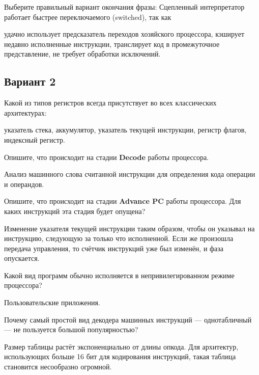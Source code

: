 \begin{questions}
\question[3] Выберите правильный вариант окончания фразы: Сцепленный интерпретатор работает быстрее переключаемого (switched), так как
\begin{choices}
    \correctchoice удачно использует предсказатель переходов хозяйского процессора,
    \choice кэширует недавно исполненные инструкции,
    \choice транслирует код в промежуточное представление,
    \choice не требует обработки исключений.
\end{choices}

\end{questions}

\subsection*{Вариант 2}

\begin{questions}

\question[3] Какой из типов регистров всегда присутствует во всех классических архитектурах:
\begin{choices}
\choice указатель стека,
\choice аккумулятор,
\correctchoice указатель текущей инструкции,
\choice регистр флагов,
\choice индексный регистр.
\end{choices}

\question[3] Опишите, что происходит на стадии \textbf{Decode} работы процессора.
\begin{solution}[1cm]
Анализ машинного слова считанной инструкции для определения кода операции и операндов.
\end{solution}

\question[3] Опишите, что происходит на стадии \textbf{Advance PC} работы процессора. Для каких инструкций эта стадия будет опущена?
\begin{solution}[2cm]
Изменение указателя текущей инструкции таким образом, чтобы он указывал на инструкцию, следующую за только что исполненной. Если же произошла передача управления, то счётчик инструкций уже был изменён, и фаза опускается.
\end{solution}

\question[3] Какой вид программ обычно исполняется в непривилегированном режиме процессора?
\begin{solution}[1cm]
Пользовательские приложения.
\end{solution}


\question[3] Почему самый простой вид декодера машинных инструкций --- однотабличный --- не пользуется большой популярностью?
\begin{solution}[1cm]
    Размер таблицы растёт экспоненциально от длины опкода. Для архитектур, использующих больше 16 бит для кодирования инструкций, такая таблица становится несообразно огромной.
\end{solution}


\end{questions}
